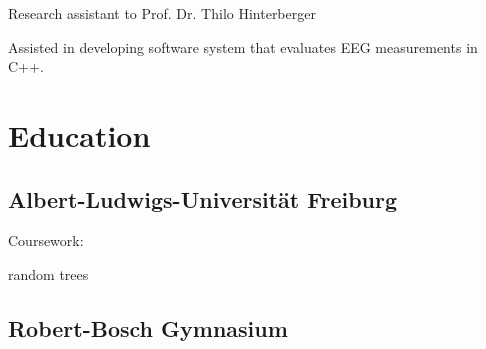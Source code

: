 \documentclass[]{deedy-resume-openfont}
\begin{document}
\begin{minipage}[t]{0.62\textwidth}
\begin{tightemize}
\item Research assistant to Prof. Dr. Thilo Hinterberger
\item Assisted in developing software system that evaluates EEG measurements in C++.
\end{tightemize}
\sectionsep


\section{Education} 

\subsection{Albert-Ludwigs-Universität Freiburg}
\sectionsep
Coursework:
\begin{tightemize}
\item random trees
\end{tightemize}
\sectionsep

\subsection{Robert-Bosch Gymnasium}
\sectionsep




\end{minipage}
\end{document}
